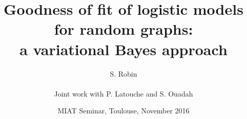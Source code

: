 \documentclass[10pt]{beamer}
\newcommand{\fignet}{../FIGURES}
\begin{document}

\title[GOF for graph models]{Goodness of fit of logistic models for random graphs: \\
a variational Bayes approach}

\author[S. Robin]{S. Robin \\ ~\\
  Joint work with P. Latouche and S. Ouadah}


\date[MIAT, Nov. 2016]{MIAT Seminar, Toulouse, November 2016}

\maketitle

\end{document}
